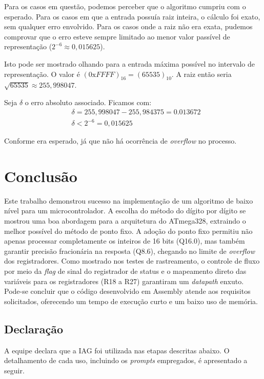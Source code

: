 \documentclass[conference]{IEEEtran}
\begin{document}
Para os casos em questão, podemos perceber que o algoritmo cumpriu com o esperado. Para os casos em que a entrada possuía raiz inteira, o cálculo foi exato, sem qualquer erro envolvido. Para os casos onde a raiz não era exata, pudemos comprovar que o erro esteve sempre limitado ao menor valor passível de representação ($2^{-6} \approx 0,015625$).

Isto pode ser mostrado olhando para a entrada máxima possível no intervalo de representação. O valor é $(0\text{x}FFFF)_{16}  = (65535)_{10}$. A raiz então seria $\sqrt{65535} \approx 255,998047$. 

Seja $\delta$ o erro absoluto associado. Ficamos com:
\begin{align*}
    & \delta = 255,998047 - 255,984375 = 0.013672 \\
    & \delta < 2^{-6} = 0,015625
\end{align*}

Conforme era esperado, já que não há ocorrência de \textit{overflow} no processo.

\section{Conclusão}
Este trabalho demonstrou sucesso na implementação de um algoritmo de baixo nível para um microcontrolador. A escolha do método do dígito por dígito se mostrou uma boa abordagem para a arquitetura do ATmega328, extraindo o melhor possível do método de ponto fixo. A adoção do ponto fixo permitiu não apenas processar completamente os inteiros de 16 bits (Q16.0), mas também garantir precisão fracionária na resposta (Q8.6), chegando no limite de \textit{overflow} dos registradores. Como mostrado nos testes de rastreamento, o controle de fluxo por meio da \textit{flag} de sinal do registrador de status e o mapeamento direto das variáveis para os registradores (R18 a R27) garantiram um \textit{datapath} enxuto. Pode-se concluir que o código desenvolvido em Assembly atende aos requisitos solicitados, oferecendo um tempo de execução curto e um baixo uso de memória.


\subsection*{Declaração}
A equipe declara que a IAG foi utilizada nas etapas descritas abaixo. O detalhamento de cada uso, incluindo os \textit{prompts} empregados, é apresentado a seguir.
\end{document}
